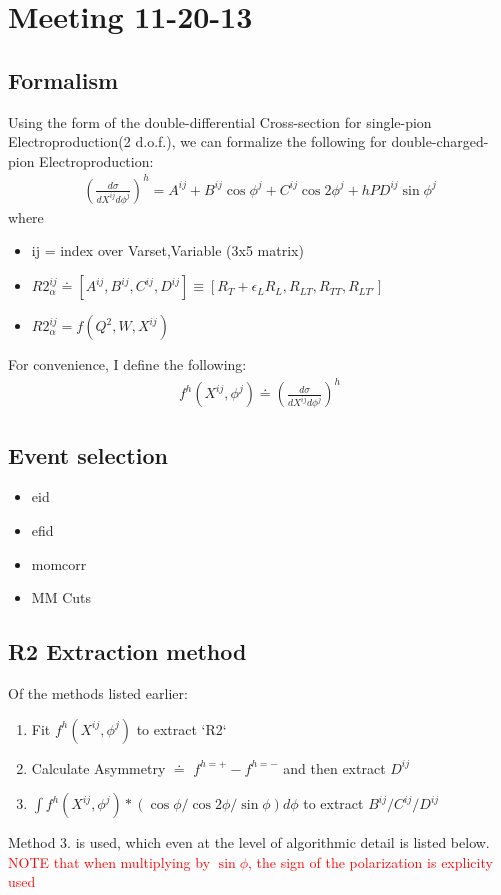 \documentclass{article}
\numberwithin{equation}{subsection}
\begin{document}
\tableofcontents

\section{Meeting 11-20-13}
\subsection{Formalism}
Using the form of the double-differential Cross-section for single-pion Electroproduction(2 d.o.f.), we can formalize the following for double-charged-pion Electroproduction:
\begin{eqnarray}
\left(\frac{d\sigma}{dX^{ij}d\phi^{j}}\right)^{h} = 
A^{ij} +  B^{ij}\cos\phi^{j} + C^{ij}\cos2\phi^{j} + hPD^{ij}\sin\phi^{j}
\end{eqnarray}
where
\begin{itemize}
	\item ij = index over Varset,Variable (3x5 matrix)
	\item $R2^{ij}_{\alpha} \doteq 
	[A^{ij},B^{ij},C^{ij},D^{ij}] \equiv 
	[R_{T}+\epsilon_{L}R_{L}, R_{LT}, R_{TT}, R_{LT'}]$
	\item $R2^{ij}_{\alpha} = f(Q^{2},W,X^{ij})$
\end{itemize}

For convenience, I define the following:
\begin{eqnarray}
f^{h}(X^{ij},\phi^{j}) \doteq \left(\frac{d\sigma}{dX^{ij}d\phi^{j}}\right)^{h}
\end{eqnarray}


\subsection{Event selection}
\begin{itemize}
	\item eid
	\item efid
	\item momcorr
	\item MM Cuts
\end{itemize}

\subsection{R2 Extraction method}
Of the methods listed earlier:
\begin{enumerate}
	\item Fit $f^{h}(X^{ij},\phi^{j})$ to extract `R2`
	\item Calculate Asymmetry $\doteq$ $f^{h=+}-f^{h=-}$ and then extract $D^{ij}$
	\item $\int f^{h}(X^{ij},\phi^{j}) * (\cos\phi/\cos 2\phi/\sin\phi)d\phi$ to extract $B^{ij}/C^{ij}/D^{ij}$
\end{enumerate}
Method 3. is used, which even at the level of algorithmic detail is listed below. \textcolor{red}{NOTE that when multiplying by $\sin\phi$, the sign of the polarization is explicity used}
\end{document}
